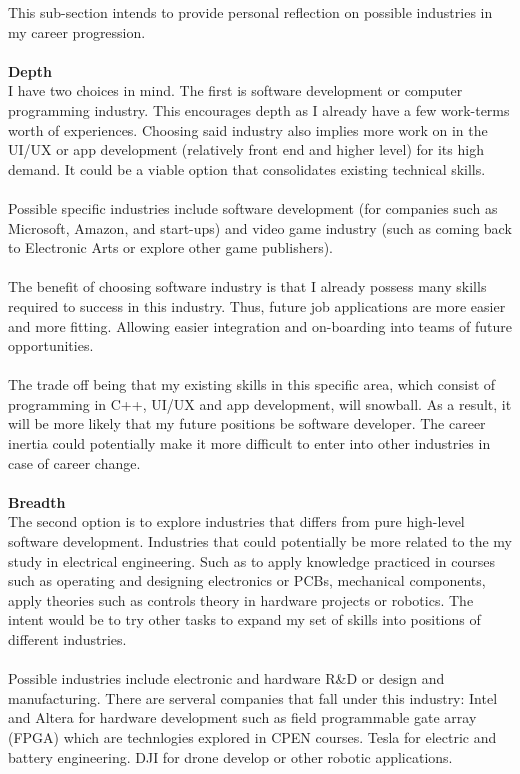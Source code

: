 \documentclass[10pt,letterpaper]{article}
\begin{document}
This sub-section intends to provide personal reflection on possible industries in my career progression.\\
\\
\textbf{Depth}\\
I have two choices in mind. The first is software development or computer programming industry. This encourages depth as I already have a few work-terms worth of experiences. Choosing said industry also implies more work on in the UI/UX or app development (relatively front end and higher level) for its high demand. It could be a viable option that consolidates existing technical skills.\cite{naics}\\
\\
Possible specific industries include software development (for companies such as Microsoft, Amazon, and start-ups) and video game industry (such as coming back to Electronic Arts or explore other game publishers).\\
\\
The benefit of choosing software industry is that I already possess many skills required to success in this industry. Thus, future job applications are more easier and more fitting. Allowing easier integration and on-boarding into teams of future opportunities.\\
\\
The trade off being that my existing skills in this specific area, which consist of programming in C++, UI/UX and app development, will snowball. As a result, it will be more likely that my future positions be software developer. The career inertia could potentially make it more difficult to enter into  other industries in case of career change.\\
\\
\textbf{Breadth}\\
The second option is to explore industries that differs from pure high-level software development. Industries that could potentially be more related to the my study in electrical engineering. Such as to apply knowledge practiced in courses such as operating and designing electronics or PCBs, mechanical components, apply theories such as controls theory in hardware projects or robotics. The intent would be to try other tasks to expand my set of skills into positions of different industries.\cite{naics}\\
\\
Possible industries include electronic and hardware R\&D or design and manufacturing. There are serveral companies that fall under this industry: Intel and Altera for hardware development such as field programmable gate array (FPGA) which are technlogies explored in CPEN courses. Tesla for electric and battery engineering. DJI for drone develop or other robotic applications.\\
\end{document}
